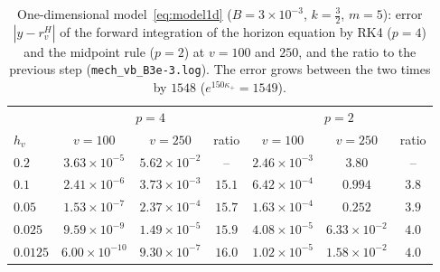 \documentclass[11pt]{article}
\begin{document}
\begin{table}[ht]\centering\small
\caption{One-dimensional model~\eqref{eq:model1d} ($B=3\times10^{-3}$, $k=\tfrac32$, $m=5$): error $|y-r_v^{H}|$ of the forward integration of the horizon equation by RK4 ($p=4$) and the midpoint rule ($p=2$) at $v=100$ and $250$, and the ratio to the previous step (\texttt{mech\_vb\_B3e-3.log}). The error grows between the two times by $1548$ ($e^{150\kappa_+}=1549$).}\label{tab:mech1d}
\begin{tabular}{lcccccc}
\toprule
 & \multicolumn{3}{c}{$p=4$} & \multicolumn{3}{c}{$p=2$}\\
$h_v$ & $v=100$ & $v=250$ & ratio & $v=100$ & $v=250$ & ratio\\\midrule
$0.2$ & $3.63\!\times\!10^{-5}$ & $5.62\!\times\!10^{-2}$ & -- & $2.46\!\times\!10^{-3}$ & $3.80$ & --\\
$0.1$ & $2.41\!\times\!10^{-6}$ & $3.73\!\times\!10^{-3}$ & $15.1$ & $6.42\!\times\!10^{-4}$ & $0.994$ & $3.8$\\
$0.05$ & $1.53\!\times\!10^{-7}$ & $2.37\!\times\!10^{-4}$ & $15.7$ & $1.63\!\times\!10^{-4}$ & $0.252$ & $3.9$\\
$0.025$ & $9.59\!\times\!10^{-9}$ & $1.49\!\times\!10^{-5}$ & $15.9$ & $4.08\!\times\!10^{-5}$ & $6.33\!\times\!10^{-2}$ & $4.0$\\
$0.0125$ & $6.00\!\times\!10^{-10}$ & $9.30\!\times\!10^{-7}$ & $16.0$ & $1.02\!\times\!10^{-5}$ & $1.58\!\times\!10^{-2}$ & $4.0$\\\bottomrule
\end{tabular}
\end{table}
\end{document}
